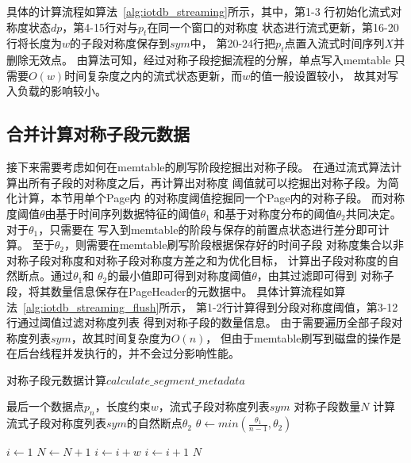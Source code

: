 具体的计算流程如算法~\ref{alg:iotdb_streaming}所示，其中，第1-3
行初始化流式对称度状态$dp$，第4-15行对与$p_t$在同一个窗口的对称度
状态进行流式更新，第16-20行将长度为$w$的子段对称度保存到$sym$中，
第20-24行把$p_t$点置入流式时间序列$X$并删除无效点。
由算法可知，经过对称子段挖掘流程的分解，单点写入memtable
只需要$O(w)$时间复杂度之内的流式状态更新，而$w$的值一般设置较小，
故其对写入负载的影响较小。

\subsection{合并计算对称子段元数据}

接下来需要考虑如何在memtable的刷写阶段挖掘出对称子段。
在通过流式算法计算出所有子段的对称度之后，再计算出对称度
阈值就可以挖掘出对称子段。为简化计算，本节用单个Page内
的对称度阈值挖掘同一个Page内的对称子段。
而对称度阈值$\theta$由基于时间序列数据特征的阈值$\theta_1$
和基于对称度分布的阈值$\theta_2$共同决定。
对于$\theta_1$，只需要在
写入到memtable的阶段与保存的前置点状态进行差分即可计算。
至于$\theta_2$，则需要在memtable刷写阶段根据保存好的时间子段
对称度集合以非对称子段对称度和对称子段对称度方差之和为优化目标，
计算出子段对称度的自然断点。通过$\theta_1$和
$\theta_2$的最小值即可得到对称度阈值$\theta$，由其过滤即可得到
对称子段，将其数量信息保存在PageHeader的元数据中。
具体计算流程如算法~\ref{alg:iotdb_streaming_flush}所示，
第1-2行计算得到分段对称度阈值，第3-12行通过阈值过滤对称度列表
得到对称子段的数量信息。
由于需要遍历全部子段对称度列表$sym$，故其时间复杂度为$O(n)$，
但由于memtable刷写到磁盘的操作是在后台线程并发执行的，并不会过分影响性能。

\renewcommand{\algorithmicrequire}{\textbf{输入：}\unskip}
\renewcommand{\algorithmicensure}{\textbf{输出：}\unskip}

\begin{algorithm}
  \caption{对称子段元数据计算$calculate\_segment\_metadata$}
  \label{alg:iotdb_streaming_flush}
  \small
  \begin{algorithmic}
    \REQUIRE 最后一个数据点$p_n$，长度约束$w$，流式子段对称度列表$sym$
    \ENSURE 对称子段数量$N$
    \STATE 计算流式子段对称度列表$sym$的自然断点$\theta_2$
    \STATE $\theta \leftarrow min(\frac{\theta_1}{n-1},\theta_2)$

    \STATE $i \leftarrow 1$
    \STATE $N \leftarrow N+1$
    \STATE $i \leftarrow i+w$
    \ELSE
    \STATE $i \leftarrow i+1$
    \ENDIF
    \ENDWHILE
    \RETURN $N$
  \end{algorithmic}
\end{algorithm}

